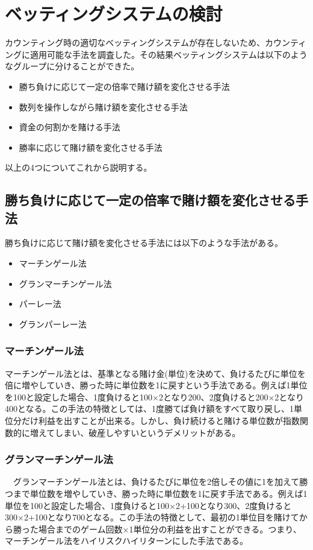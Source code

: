 ﻿\section{ベッティングシステムの検討}
 カウンティング時の適切なベッティングシステムが存在しないため、カウンティングに適用可能な手法を調査した。その結果ベッティングシステムは以下のようなグループに分けることができた。
\begin{itemize}
\item 勝ち負けに応じて一定の倍率で賭け額を変化させる手法
\item 数列を操作しながら賭け額を変化させる手法
\item 資金の何割かを賭ける手法
\item 勝率に応じて賭け額を変化させる手法
\end{itemize}
以上の4つについてこれから説明する。

\subsection{勝ち負けに応じて一定の倍率で賭け額を変化させる手法}
勝ち負けに応じて賭け額を変化させる手法には以下のような手法がある。
 \begin{itemize}
 \item マーチンゲール法
 \item グランマーチンゲール法
 \item パーレー法
 \item グランパーレー法
 \end{itemize}
\subsubsection{マーチンゲール法}  
 マーチンゲール法とは、基準となる賭け金(単位)を決めて、負けるたびに単位を倍に増やしていき、勝った時に単位数を1に戻すという手法である。例えば1単位を100と設定した場合、1度負けると100×2となり200、2度負けると200×2となり400となる。この手法の特徴としては、1度勝てば負け額をすべて取り戻し、1単位分だけ利益を出すことが出来る。しかし、負け続けると賭ける単位数が指数関数的に増えてしまい、破産しやすいというデメリットがある。
\subsubsection{グランマーチンゲール法} 
　グランマーチンゲール法とは、負けるたびに単位を2倍しその値に1を加えて勝つまで単位数を増やしていき、勝った時に単位数を1に戻す手法である。例えば1単位を100と設定した場合、1度負けると100×2+100となり300、2度負けると300×2+100となり700となる。この手法の特徴として、最初の1単位目を賭けてから勝った場合までのゲーム回数×1単位分の利益を出すことができる。つまり、マーチンゲール法をハイリスクハイリターンにした手法である。
